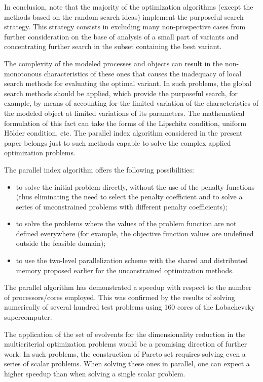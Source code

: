 \documentclass{llncs}
\begin{document}
In conclusion, note that the majority of the optimization algorithms (except the methods based 
on the random search ideas) implement the purposeful search strategy. This strategy consists in 
excluding many non-prospective cases from further consideration on the base of 
analysis of a small part of variants and concentrating further search in the subset containing the 
best variant. 

The complexity of the modeled processes and objects can result in the non-monotonous
characteristics of these ones that causes the inadequacy of local search 
methods for evaluating the optimal variant. In such problems, the global search methods should 
be applied, which provide the purposeful search, for example, by means of accounting for the 
limited variation of the characteristics of the modeled object at limited variations of its 
parameters. The mathematical formulation of this fact can take the forms of the Lipschitz 
condition, uniform H\"older condition, etc. The parallel index algorithm considered in the 
present paper belongs just to such methods capable to solve the complex applied optimization 
problems. 

The parallel index algorithm %
offers the following possibilities:
\begin{itemize}
	\item to solve the initial problem directly, without the use of the penalty functions (thus 
eliminating the need to select the penalty coefficient and to solve a series of unconstrained 
problems with different penalty coefficients);
	\item to solve the problems where the values of the problem function are not defined 
everywhere (for example, the objective function values are undefined outside the feasible 
domain);
	\item to use the two-level parallelization scheme with the shared and distributed memory 
proposed earlier for the unconstrained optimization methods.
\end{itemize}

The parallel algorithm has demonstrated a speedup with respect to the number of 
processors/cores employed. This was confirmed by the results of solving numerically of several 
hundred test problems using 160 cores of the Lobachevsky supercomputer. 

The application of the set of evolvents for the dimensionality reduction in the multicriterial 
optimization problems would be a promising direction of further work. In such problems, the 
construction of Pareto set requires solving even a series of scalar problems. When solving these 
ones in parallel, one can expect a higher speedup than when solving a single scalar problem.
\end{document}
